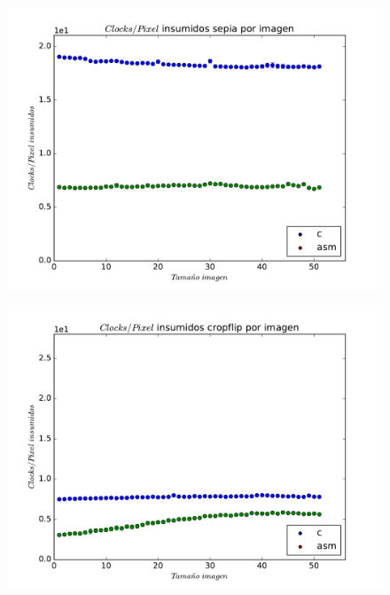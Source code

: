 \begin{figure}[h]
  \begin{center}
	\includegraphics[scale=0.5]{sepiaall.pdf}
  \end{center}
\end{figure}

\begin{figure}[h]
  \begin{center}
	\includegraphics[scale=0.5]{cropflipall.pdf}
  \end{center}
\end{figure}

